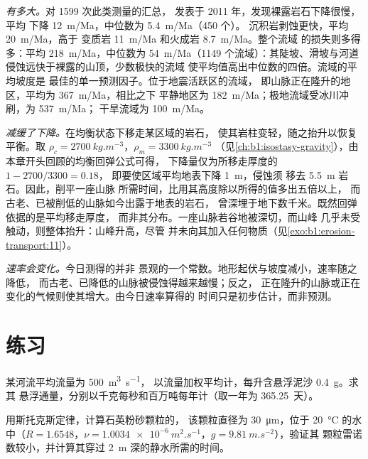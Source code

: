 \emph{有多大。}对 \num{1599} 次此类测量的汇总，
发表于 2011 年，发现裸露岩石下降很慢，平均
下降 \qty{12}{m/Ma}，中位数为 \qty{5.4}{m/Ma}（450 个）。
沉积岩剥蚀更快，平均 \qty{20}{m/Ma}，高于
变质岩 \qty{11}{m/Ma} 和火成岩 \qty{8.7}{m/Ma}。整个流域
的损失则多得多：平均 \qty{218}{m/Ma}，中位数为
\qty{54}{m/Ma}（\num{1149} 个流域）：其陡坡、滑坡与河道
侵蚀远快于裸露的山顶，少数极快的流域
使平均值高出中位数的四倍。流域的平均坡度是
最佳的单一预测因子。位于地震活跃区的流域，
即山脉正在隆升的地区，平均为 \qty{367}{m/Ma}，相比之下
平静地区为 \qty{182}{m/Ma}；极地流域受冰川冲刷，为 \qty{537}{m/Ma}；
干旱流域为 \qty{100}{m/Ma}。

\emph{减缓了下降。}在均衡状态下移走某区域的岩石，
使其岩柱变轻，随之抬升以恢复平衡。取 $\rho_c
= \qty{2700}{kg.m^{-3}}$，$\rho_m = \qty{3300}{kg.m^{-3}}$
（见\cref{ch:b1:isostasy-gravity}），由本章开头回顾的均衡回弹公式可得，
下降量仅为所移走厚度的 $1 - 2700/3300 = 0.18$，
即要使区域平均地表下降 \qty{1}{m}，侵蚀须
移去 \qty{5.5}{m} 岩石。因此，削平一座山脉
所需时间，比用其高度除以所得的值多出五倍以上，
而古老、已被削低的山脉如今出露于地表的岩石，
曾深埋于地下数千米。既然回弹依据的是平均移走厚度，
而非其分布。一座山脉若谷地被深切，而山峰
几乎未受触动，则整体抬升：山峰升高，尽管
并未向其加入任何物质（见\cref{exo:b1:erosion-transport:11}）。

\emph{速率会变化。}今日测得的并非
景观的一个常数。地形起伏与坡度减小，速率随之降低，
而古老、已降低的山脉被侵蚀得越来越慢；反之，
正在隆升的山脉或正在变化的气候则使其增大。由今日速率算得的
时间只是初步估计，而非预测。

\section{练习}

\begin{exercise}[$\star$]\label{exo:b1:erosion-transport:1}
某河流平均流量为 \qty{500}{m^3.s^{-1}}，
以流量加权平均计，每升含悬浮泥沙 \qty{0.4}{g}。求其
悬浮通量，分别以千克每秒和百万吨每年计（取一年为
\num{365.25}~天）。
\end{exercise}

\begin{exercise}[$\star$]\label{exo:b1:erosion-transport:2}
用斯托克斯定律，计算石英粉砂颗粒的，
该颗粒直径为 \qty{30}{\micro m}，位于 \qty{20}{\celsius} 的水中（$R = 1.6548$，$\nu =
\qty{1.0034e-6}{m^2.s^{-1}}$，$g = \qty{9.81}{m.s^{-2}}$），验证其
颗粒雷诺数较小，并计算其穿过
\qty{2}{m} 深的静水所需的时间。
\end{exercise}

